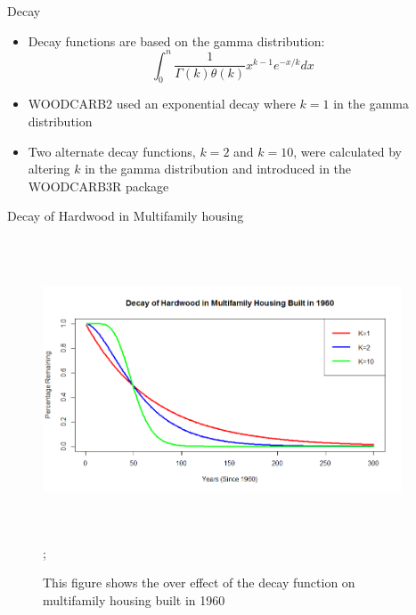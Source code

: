 \documentclass[final]{beamer}\usepackage[]{graphicx}\usepackage[]{color}
\newlength{\onecolwid}
\newlength{\twocolwid}
\begin{document}
\begin{frame}[t]
\begin{columns}[t]
\begin{column}{\twocolwid}
\begin{columns}[t,totalwidth=\twocolwid]
\begin{column}{\onecolwid}
\begin{block}{Decay}
\begin{itemize}
\item Decay functions are based on the gamma distribution:
$$\int_{0}^{n}\frac{1}{\Gamma(k)\theta(k)}x^{k-1}e^{-x/k}dx$$
\item WOODCARB2 used an exponential decay where $k=1$ in the gamma distribution
\item Two alternate decay functions, $k=2$ and $k=10$, were calculated by altering $k$ in the gamma distribution and introduced in the WOODCARB3R package
\end{itemize}
\end{block}
\begin{block}{Decay of Hardwood in Multifamily housing}
\begin{center}
\begin{figure}
    {\includegraphics[width=1\linewidth, height=9cm]{Decay_Plot_Example.png}};
    \caption{This figure shows the over effect of the decay function on multifamily housing built in 1960}
\end{figure}
\end{center}

\end{block}



\end{column} %

\begin{column}{\onecolwid} %


\end{column}
\end{columns}
\end{column}
\end{columns}
\end{frame}
\end{document}
